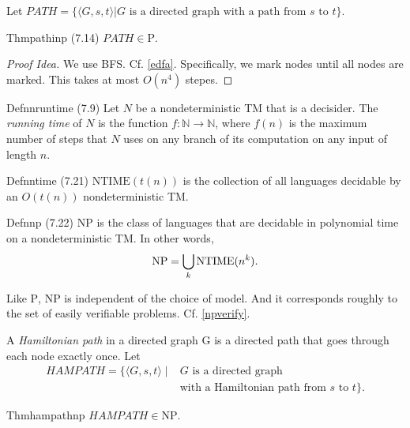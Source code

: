 Let $\textit{PATH}=\{\langle G,s,t\rangle|G\text{ is a directed graph with a path from $s$ to $t$}\}.$

\begin{reference}{Thm}{pathinp}
  (7.14) $\textit{PATH}\in \mathrm{P}$.
\end{reference}

\begin{proof}[Proof Idea]
  We use BFS. Cf. \ref{edfa}. Specifically, we mark nodes until all nodes are marked. This takes at most $O(n^4)$ stepes.
\end{proof}

\begin{reference}{Defn}{nruntime}
  (7.9) Let $N$ be a nondeterministic TM that is a decisider. The \emph{running time} of $N$ is the function $f:\mathbb{N}\to \mathbb{N}$, where $f(n)$ is the maximum number of steps that $N$ uses on any branch of its computation on any input of length $n$.
\end{reference}

\begin{reference}{Defn}{ntime}
  (7.21) $\mathrm{NTIME}(t(n))$ is the collection of all languages decidable by an $O(t(n))$ nondeterministic TM.
\end{reference}

\begin{reference}{Defn}{np}
  (7.22) $\mathrm{NP}$ is the class of languages that are decidable in polynomial time on a nondeterministic TM. In other words,
  \[
    \mathrm{NP}=\bigcup_k \mathrm{NTIME}(n^k).\qedhere
  \]
\end{reference}

Like $\mathrm{P}$, $\mathrm{NP}$ is independent of the choice of model. And it corresponds roughly to the set of easily verifiable problems. Cf. \ref{npverify}.

A \emph{Hamiltonian path} in a directed graph G is a directed path that goes through each node exactly once. Let
\begin{align*}
  \textit{HAMPATH} = \{ \langle G, s, t \rangle \mid & G \text{ is a directed graph}                            \\
                                                     & \text{with a Hamiltonian path from } s \text{ to } t \}.
\end{align*}

\begin{reference}{Thm}{hampathnp}
  $\textit{HAMPATH}\in \mathrm{NP}$.
\end{reference}

